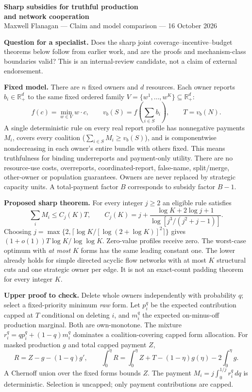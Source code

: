 \documentclass[11pt]{article}
\begin{document}
\begin{center}
{\Large\bfseries Sharp subsidies for truthful production\\and network cooperation}\\[5pt]
Maxwell Flanagan --- Claim and model comparison --- 16 October 2026
\end{center}
\textbf{Question for a specialist.} Does the sharp joint coverage--incentive--budget
theorems below follow from earlier work, and are the proofs and mechanism-class boundaries valid?
This is an internal-review candidate, not a claim of external endorsement.

\textbf{Fixed model.} There are $n$ fixed owners and $d$ resources. Each owner
reports $b_i\in\mathbb R_+^d$ to the same fixed ordered family
$V=\{w^1,\ldots,w^K\}\subseteq\mathbb R_+^d$:
\[
 f(c)=\min_{w\in V}w\cdot c,\qquad
 v_b(S)=f\left(\sum_{i\in S}b_i\right),\qquad T=v_b(N).
\]
A single deterministic rule on every real report profile has nonnegative
payments $M_i$, covers every coalition ($\sum_{i\in S}M_i\ge v_b(S)$), and
is componentwise nondecreasing in each owner's entire bundle with others fixed.
This means truthfulness for binding underreports and payment-only utility.
There are no resource-use costs, overreports, coordinated-report, false-name,
split/merge, other-owner or population guarantees. Owners are never replaced
by strategic capacity units. A total-payment factor $B$ corresponds to subsidy
factor $B-1$.

\textbf{Proposed sharp theorem.} For every integer $j\ge2$ an eligible rule satisfies
\[
 \sum_iM_i\le C_j(K)T,\qquad
 C_j(K)=j+\frac{\log K+2\log j+1}{\log[j^3/(j^2+j-1)]}.
\]
Choosing $j=\max\{2,\lceil\log K/[\log(2+\log K)]^2\rceil\}$ gives
$(1+o(1))T\log K/\log\log K$. Zero-value profiles receive zero.
The worst-case optimum with \emph{at most} $K$ forms has the same leading
constant one. The lower already holds for simple directed acyclic flow
networks with at most $K$ structural cuts and one strategic owner per edge.
It is not an exact-count padding theorem for every integer $K$.

\textbf{Upper proof to check.} Delete whole owners independently with probability
$q$; select a fixed-priority minimum \emph{raw} form. Let $p_i^q$ be the
expected contribution capped at $T$ conditional on deleting $i$, and $m_i^q$
the expected on-minus-off production marginal. Both are own-monotone.
The mixture $r_i^q=qp_i^q+(1-q)m_i^q$ dominates a coalition-covering capped
form allocation. For masked production $g$ and total capped payment $Z$,
\[
 R=Z-g-(1-q)g',\qquad
 \int_0^\eta R=\int_0^\eta Z+T-(1-\eta)g(\eta)-2\int_0^\eta g.
\]
A Chernoff union over the fixed forms bounds $Z$. The payment
$M_i=j\int_0^{1/j}r_i^q\,dq$ is deterministic. Selection is uncapped;
only payment contributions are capped.
\end{document}
